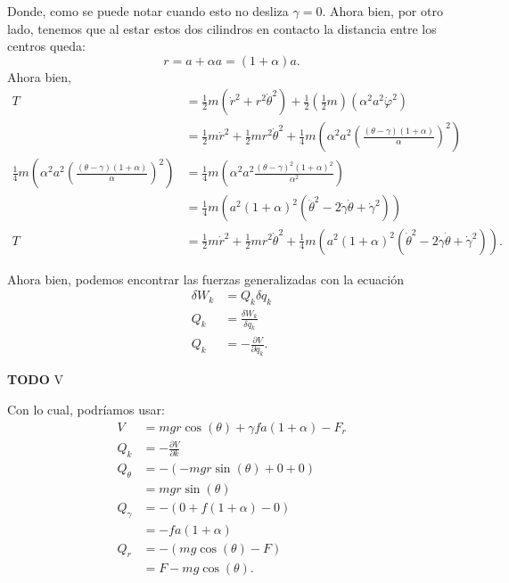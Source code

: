 \documentclass{report}
\begin{document}
Donde, como se puede notar cuando esto no desliza $\gamma = 0$. Ahora bien, por otro lado, tenemos que al estar estos dos cilindros en contacto la distancia entre los centros queda: \[
r = a + \alpha a = \left( 1 + \alpha \right) a
.\] Ahora bien,
\begin{align*}
  T &= \frac{1}{2}m\left( \dot{r}^2 + r^2\dot{\theta}^2 \right) + \frac{1}{2}\left( \frac{1}{2}m \right) \left( \alpha^2 a^2 \dot{\varphi}^2 \right)  \\
    &= \frac{1}{2}m\dot{r}^2 + \frac{1}{2}m r^2\dot{\theta}^2 + \frac{1}{4}m\left( \alpha^2 a^2 \left( \frac{\left( \theta - \gamma \right)\left( 1 + \alpha \right) }{\alpha} \right)^2 \right) \\ 
    \frac{1}{4} m \left( \alpha^2 a^2 \left( \frac{\left( \theta - \gamma \right) \left( 1 + \alpha \right) }{\alpha} \right)^2 \right) &= \frac{1}{4}m \left( \alpha^2 a^2 \frac{\left( \theta - \gamma \right)^2 \left( 1 + \alpha \right)^2}{\alpha^2} \right)  \\
    &=  \frac{1}{4}m \left( a^2 \left( 1 + \alpha \right)^2 \left( \dot{\theta}^2 - 2\dot{\gamma}\dot{\theta} + \dot{\gamma}^2 \right)  \right) \\
    T &= \frac{1}{2}m\dot{r}^2 + \frac{1}{2}m r^2\dot{\theta}^2 +\frac{1}{4}m \left( a^2 \left( 1 + \alpha \right)^2 \left( \dot{\theta}^2 - 2\dot{\gamma}\dot{\theta} + \dot{\gamma}^2 \right)  \right)
.\end{align*}

Ahora bien, podemos encontrar las fuerzas generalizadas con la ecuación
\begin{align*}
  \delta W_k &= Q_k \delta q_k \\
  Q_k &= \frac{\delta W_k}{\delta q_k} \\
  Q_k &= - \frac{\partial V}{\partial q_k}
.\end{align*}

\textbf{TODO} V

Con lo cual, podríamos usar:
\begin{align*}
  V &= mgr\cos\left( \theta \right) + \gamma fa\left( 1 + \alpha \right) - F_r  \\
  Q_k &= - \frac{\partial V}{\partial k}  \\
  Q_\theta &= - \left( - mgr \sin\left( \theta \right) + 0 + 0 \right)  \\
  &= mgr \sin\left( \theta \right)  \\
  Q_\gamma &= - \left( 0 + f\left( 1 + \alpha \right) - 0 \right)  \\
  &= -fa\left( 1 + \alpha \right)  \\
  Q_r &= - \left( mg\cos\left( \theta \right) - F\right)  \\
  &= F - mg\cos\left( \theta \right)
.\end{align*}
\end{document}
